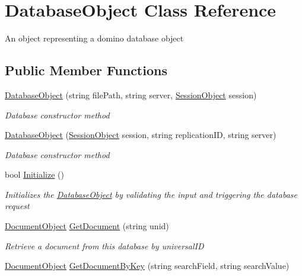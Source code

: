 \hypertarget{class_database_object}{}\section{Database\+Object Class Reference}
\label{class_database_object}


An object representing a domino database object  


\subsection*{Public Member Functions}
\begin{DoxyCompactItemize}
\item 
\hyperlink{class_database_object_ab16b4327b02ffedcd1b003cea9d949a1}{Database\+Object} (string file\+Path, string server, \hyperlink{class_session_object}{Session\+Object} session)
\begin{DoxyCompactList}\small\item\em Database constructor method \end{DoxyCompactList}\item 
\hyperlink{class_database_object_a75d3e8a876c6899bd01b866e35475ed2}{Database\+Object} (\hyperlink{class_session_object}{Session\+Object} session, string replication\+ID, string server)
\begin{DoxyCompactList}\small\item\em Database constructor method \end{DoxyCompactList}\item 
bool \hyperlink{class_database_object_a7de43a21bd287deec537cffec343f41d}{Initialize} ()
\begin{DoxyCompactList}\small\item\em Initializes the \hyperlink{class_database_object}{Database\+Object} by validating the input and triggering the database request \end{DoxyCompactList}\item 
\hyperlink{class_document_object}{Document\+Object} \hyperlink{class_database_object_a9435cc20fe3a92747e509011b7726aff}{Get\+Document} (string unid)
\begin{DoxyCompactList}\small\item\em Retrieve a document from this database by universal\+ID \end{DoxyCompactList}\item 
\hyperlink{class_document_object}{Document\+Object} \hyperlink{class_database_object_a57bfc77d2754236cbcf6ac30a90da529}{Get\+Document\+By\+Key} (string search\+Field, string search\+Value)

\end{DoxyCompactItemize}
